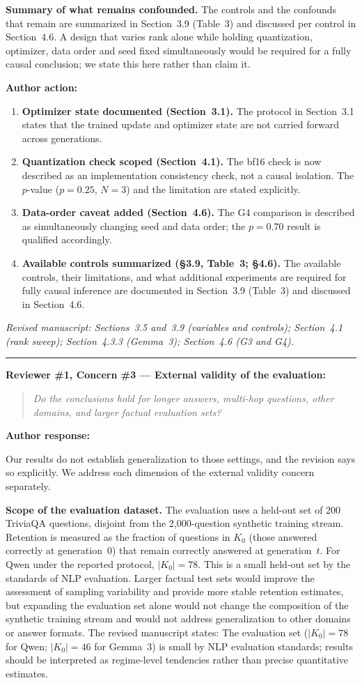 \documentclass[11pt,a4paper]{article}
\newcommand{\newtext}[1]{#1}
\newcommand{\rconcern}[3]{%
  \bigskip\noindent\rule{\linewidth}{0.4pt}\par\medskip
  \noindent\textbf{\textcolor{rccolor}{#1 --- #2:}}\par
  \smallskip
  \begin{quote}\itshape\textcolor{rccolor}{#3}\end{quote}%
}
\newcommand{\arhead}[1]{\medskip\noindent\textbf{#1}\par\smallskip}
\newcommand{\newtext}[1]{\textcolor{chgcolor}{``#1''}}
\newcommand{\msloc}[1]{%
  \smallskip\noindent\textit{Revised manuscript: #1}\par%
}
\begin{document}
\textbf{Summary of what remains confounded.}
The controls and the confounds that remain are summarized in Section~3.9
(Table~3) and discussed per control in Section~4.6. A design that varies
rank alone while holding quantization, optimizer, data order and seed fixed
simultaneously would be required for a fully causal conclusion; we state
this here rather than claim it.

\arhead{Author action:}
\begin{enumerate}[leftmargin=1.4em,itemsep=0.3em]
\item \textbf{Optimizer state documented (Section~3.1).}
      The protocol in Section~3.1 states that the trained update and optimizer state are not carried forward across generations.
\item \textbf{Quantization check scoped (Section~4.1).}
      The bf16 check is now described as an implementation consistency
      check, not a causal isolation. The $p$-value ($p=0.25$, $N=3$)
      and the limitation are stated explicitly.
\item \textbf{Data-order caveat added (Section~4.6).}
      The G4 comparison is described as simultaneously changing seed
      and data order; the $p=0.70$ result is qualified accordingly.
\item \textbf{Available controls summarized (\S3.9, Table~3; \S4.6).}
      The available controls, their limitations, and what additional
      experiments are required for fully causal inference are documented
      in Section~3.9 (Table~3) and discussed in Section~4.6.
\end{enumerate}

\msloc{Sections~3.5 and~3.9 (variables and controls); Section~4.1 (rank
sweep); Section~4.3.3 (Gemma~3);
Section~4.6 (G3 and G4).}

\rconcern{Reviewer \#1, Concern \#3}{External validity of the evaluation}{Do the conclusions hold for longer answers, multi-hop questions, other domains, and larger factual evaluation sets?}

\arhead{Author response:}

Our results do not establish generalization to those settings, and the
revision says so explicitly. We address each dimension of the external
validity concern separately.

\textbf{Scope of the evaluation dataset.}
The evaluation uses a held-out set of 200 TriviaQA questions, disjoint
from the 2,000-question synthetic training stream. Retention is measured
as the fraction of questions in $K_0$ (those answered correctly at
generation~0) that remain correctly answered at generation~$t$. For Qwen
under the reported protocol, $|K_0|=78$. This is a small held-out set by
the standards of NLP evaluation. Larger factual test sets would improve
the assessment of sampling variability and provide more stable retention
estimates, but expanding the evaluation set alone would not change the
composition of the synthetic training stream and would not address
generalization to other domains or answer formats. The revised manuscript
states: \newtext{The evaluation set ($|K_0|=78$ for Qwen; $|K_0|=46$
for Gemma~3) is small by NLP evaluation standards; results should be
interpreted as regime-level tendencies rather than precise quantitative
estimates.}
\end{document}
